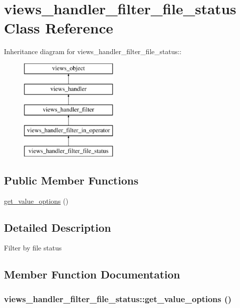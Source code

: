 \hypertarget{classviews__handler__filter__file__status}{
\section{views\_\-handler\_\-filter\_\-file\_\-status Class Reference}
\label{classviews__handler__filter__file__status}
}
Inheritance diagram for views\_\-handler\_\-filter\_\-file\_\-status::\begin{figure}[H]
\begin{center}
\leavevmode
\includegraphics[height=5cm]{classviews__handler__filter__file__status}
\end{center}
\end{figure}
\subsection*{Public Member Functions}
\begin{CompactItemize}
\item 
\hyperlink{classviews__handler__filter__file__status_06c9422d87bde6108c51d45e9d5568f4}{get\_\-value\_\-options} ()
\end{CompactItemize}


\subsection{Detailed Description}
Filter by file status 

\subsection{Member Function Documentation}
\hypertarget{classviews__handler__filter__file__status_06c9422d87bde6108c51d45e9d5568f4}{
\subsubsection[{get\_\-value\_\-options}]{\setlength{\rightskip}{0pt plus 5cm}views\_\-handler\_\-filter\_\-file\_\-status::get\_\-value\_\-options ()}}
\label{classviews__handler__filter__file__status_06c9422d87bde6108c51d45e9d5568f4}


